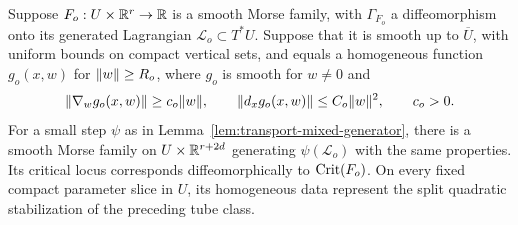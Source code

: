 \begin{proposition}
\label{prop:transport-step}
Suppose $F_o:U\times\mathbb R^r\to\mathbb R$ is a smooth Morse family, with
$\Gamma_{F_o}$ a diffeomorphism onto its generated Lagrangian
$\mathcal L_o\subset T^*U$.  Suppose that it is smooth up to
$\overline U$, with uniform bounds on compact vertical sets, and
equals a homogeneous function $g_o(x,w)$ for $\lVert w\rVert\ge R_o$, where
$g_o$ is smooth for $w\ne0$ and
\begin{equation}
 \lVert\nabla_wg_o(x,w)\rVert\ge c_o\lVert w\rVert,
 \qquad \lVert d_xg_o(x,w)\rVert\le C_o\lVert w\rVert^2,
 \qquad c_o>0.
 \label{eq:transport-old-bounds}
\end{equation}
For a small step $\psi$ as in
Lemma~\ref{lem:transport-mixed-generator}, there is a smooth Morse
family on $U\times\mathbb R^{r+2d}$ generating $\psi(\mathcal L_o)$ with
the same properties.  Its critical locus corresponds
diffeomorphically to $\operatorname{Crit}(F_o)$.  On every fixed compact parameter
slice in $U$, its homogeneous data represent the split quadratic
stabilization of the preceding tube class.
\end{proposition}

